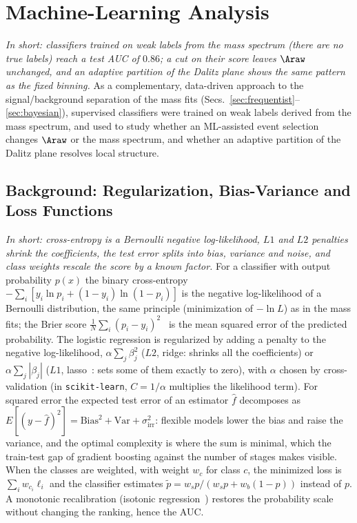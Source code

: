 \section{Machine-Learning Analysis}
\label{sec:ml}
\emph{In short: classifiers trained on weak labels from the mass spectrum (there are no true labels) reach a test AUC of $0.86$; a cut on their score leaves $\Araw$ unchanged, and an adaptive partition of the Dalitz plane shows the same pattern as the fixed binning.}
As a complementary, data-driven approach to the signal/background separation of the mass fits (Secs.~\ref{sec:frequentist}--\ref{sec:bayesian}), supervised classifiers were trained on weak labels derived from the mass spectrum, and used to study whether an ML-assisted event selection changes $\Araw$ or the mass spectrum, and whether an adaptive partition of the Dalitz plane resolves local structure.
\subsection{Background: Regularization, Bias-Variance and Loss Functions}
\label{app:theory_ml}
\emph{In short: cross-entropy is a Bernoulli negative log-likelihood, $L1$ and $L2$ penalties shrink the coefficients, the test error splits into bias, variance and noise, and class weights rescale the score by a known factor.}
For a classifier with output probability $p(x)$ the binary cross-entropy $-\sum_i[y_i\ln p_i+(1-y_i)\ln(1-p_i)]$ is the negative log-likelihood of a Bernoulli distribution, the same principle (minimization of $-\ln L$) as in the mass fits; the Brier score $\frac1N\sum_i(p_i-y_i)^2$~\cite{brier} is the mean squared error of the predicted probability. The logistic regression is regularized by adding a penalty to the negative log-likelihood, $\alpha\sum_j\beta_j^2$ ($L2$, ridge: shrinks all the coefficients) or $\alpha\sum_j|\beta_j|$ ($L1$, lasso~\cite{tibshirani_lasso}: sets some of them exactly to zero), with $\alpha$ chosen by cross-validation (in \texttt{scikit-learn}, $C=1/\alpha$ multiplies the likelihood term). For squared error the expected test error of an estimator $\hat f$ decomposes as $E[(y-\hat f)^2]=\mathrm{Bias}^2+\mathrm{Var}+\sigma^2_{\mathrm{irr}}$: flexible models lower the bias and raise the variance, and the optimal complexity is where the sum is minimal, which the train-test gap of gradient boosting against the number of stages makes visible.
When the classes are weighted, with weight $w_c$ for class $c$, the minimized loss is $\sum_iw_{c_i}\ell_i$ and the classifier estimates $\tilde p=w_sp/(w_sp+w_b(1-p))$ instead of $p$. A monotonic recalibration (isotonic regression~\cite{zadrozny_elkan}) restores the probability scale without changing the ranking, hence the AUC.
